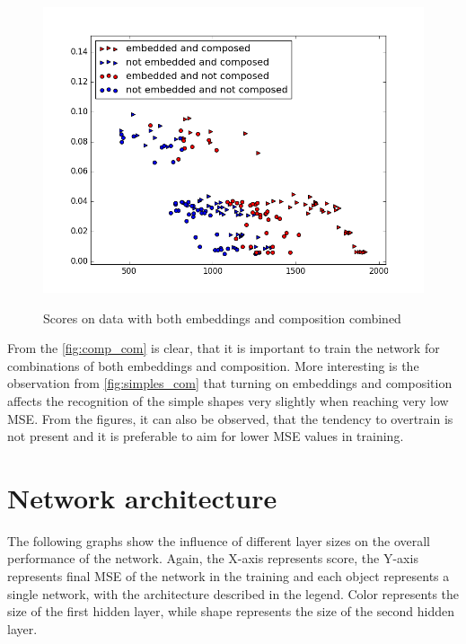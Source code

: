 \begin{figure}[!htb]
\begin{center}
\label{fig:x_com}
\includegraphics[width=\linewidth]{ext/figure_x_com.png}
\end{center}
    \centering
    \caption{Scores on data with both embeddings and composition combined}
\end{figure}

From the \ref{fig:comp_com} is clear, that it is important to train the network for combinations of both embeddings and composition. More interesting is the observation from \ref{fig:simples_com} that turning on embeddings and composition affects the recognition of the simple shapes very slightly when reaching very low MSE. From the figures, it can also be observed, that the tendency to overtrain is not present and it is preferable to aim for lower MSE values in training.

\section{Network architecture}
The following graphs show the influence of different layer sizes on the overall performance of the network. Again, the X-axis represents score, the Y-axis represents final MSE of the network in the training and each object represents a single network, with the architecture described in the legend. Color represents the size of the first hidden layer, while shape represents the size of the second hidden layer.

